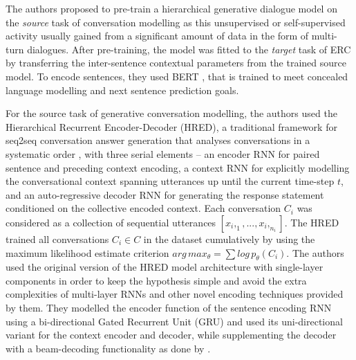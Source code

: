 The authors proposed to pre-train a hierarchical generative dialogue model on the \textit{source} task of conversation modelling as this unsupervised or self-supervised activity usually gained from a significant amount of data in the form of multi-turn dialogues. After pre-training, the model was fitted to the \textit{target} task of ERC by transferring the inter-sentence contextual parameters from the trained source model. To encode sentences, they used BERT \cite{Devlin2019BERTPO}, that is trained to meet concealed language modelling and next sentence prediction goals.

For the source task of generative conversation modelling, the authors used the Hierarchical Recurrent Encoder-Decoder (HRED), a traditional framework for seq2seq conversation answer generation that analyses conversations in a systematic order \cite{Serban2015BuildingED}, with three serial elements -- an encoder RNN for paired sentence and preceding context encoding, a context RNN for explicitly modelling the conversational context spanning utterances up until the current time-step $t$, and an auto-regressive decoder RNN for generating the response statement conditioned on the collective encoded context. Each conversation $C_i$ was considered as a collection of sequential utterances $[x_i,_1,...,x_i,_{n_i}]$. The HRED trained all conversations $C_i \in C$ in the dataset cumulatively by using the maximum likelihood estimate criterion $arg\,max_\theta = \sum log\,p_\theta(C_i)$. The authors used the original version of the HRED model architecture with single-layer components in order to keep the hypothesis simple and avoid the extra complexities of multi-layer RNNs and other novel encoding techniques provided by them. They modelled the encoder function of the sentence encoding RNN using a bi-directional Gated Recurrent Unit (GRU) \cite{Cho2014LearningPR} and used its uni-directional variant for the context encoder and decoder, while supplementing the decoder with a beam-decoding functionality as done by \cite{beam-decoding}.

